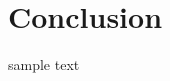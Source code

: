 \documentclass[book.tex]{subfiles}
\begin{document}
\chapter{Conclusion}

sample text
\end{document}
